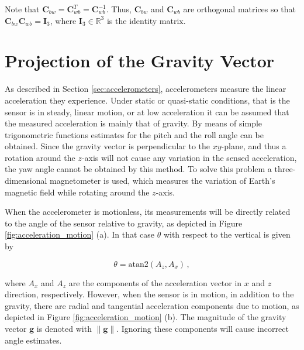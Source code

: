 \noindent
Note that $\mathbf{C}_{bw} = \mathbf{C}^T_{wb} = \mathbf{C}^{-1}_{wb}$. Thus, $\mathbf{C}^{ }_{bw}$ and $\mathbf{C}_{wb}$ are orthogonal matrices so that $\mathbf{C}^{ }_{bw} \mathbf{C}_{wb} = \mathbf{I}_3$, where $\mathbf{I}_3 \in \mathbb{R}^3$ is the identity matrix.

\section{Projection of the Gravity Vector}\label{sec:projection_gravity}


As described in Section \ref{sec:accelerometers}, accelerometers measure the linear acceleration they experience. Under static or quasi-static conditions, that is the sensor is in steady, linear motion, or at low acceleration it can be assumed that the measured acceleration is mainly that of gravity. By means of simple trigonometric functions estimates for the pitch and the roll angle can be obtained. Since the gravity vector is perpendicular to the $xy$-plane, and thus a rotation around the $z$-axis will not cause any variation in the sensed acceleration, the yaw angle cannot be obtained by this method. To solve this problem a three-dimensional magnetometer is used, which measures the variation of Earth's magnetic field while rotating around the $z$-axis.

When the accelerometer is motionless, its measurements will be directly related to the angle of the sensor relative to gravity, as depicted in Figure \ref{fig:acceleration_motion} (a). In that case $\theta$ with respect to the vertical is given by

\begin{equation} \label{eq:projection_gravity}
  \theta = \mbox{atan}2(A_z, A_x)\,,
\end{equation}

\noindent
where $A_x$ and $A_z$ are the components of the acceleration vector in $x$ and $z$ direction, respectively. However, when the sensor is in motion, in addition to the gravity, there are radial and tangential acceleration components due to motion, as depicted in Figure \ref{fig:acceleration_motion} (b). The magnitude of the gravity vector $\mathbf{g}$ is denoted with $\|\mathbf{g}\|$. Ignoring these components will cause incorrect angle estimates.

